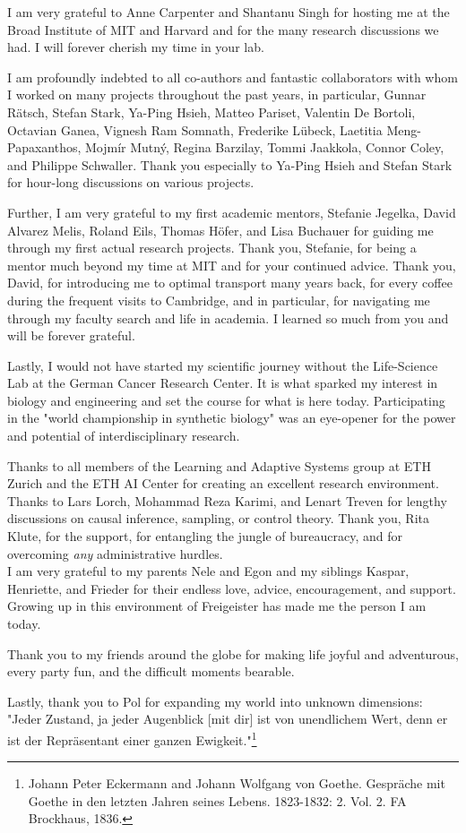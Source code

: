 I am very grateful to Anne Carpenter and Shantanu Singh for hosting me at the Broad Institute of MIT and Harvard and for the many research discussions we had. I will forever cherish my time in your lab.

I am profoundly indebted to all co-authors and fantastic collaborators with whom I worked on many projects throughout the past years, in particular, Gunnar R\"atsch, Stefan Stark, Ya-Ping Hsieh,  Matteo Pariset, Valentin De Bortoli, Octavian Ganea, Vignesh Ram Somnath, Frederike L{\"u}beck, Laetitia Meng-Papaxanthos, Mojm{\'i}r Mutn{\'y}, Regina Barzilay, Tommi Jaakkola, Connor Coley, and Philippe Schwaller. Thank you especially to Ya-Ping Hsieh and Stefan Stark for hour-long discussions on various projects. 

Further, I am very grateful to my first academic mentors, Stefanie Jegelka, David Alvarez Melis, Roland Eils, Thomas H{\"o}fer, and Lisa Buchauer for guiding me through my first actual research projects.
Thank you, Stefanie, for being a mentor much beyond my time at MIT and for your continued advice. 
Thank you, David, for introducing me to optimal transport many years back, for every coffee during the frequent visits to Cambridge, and in particular, for navigating me through my faculty search and life in academia. I learned so much from you and will be forever grateful.

Lastly, I would not have started my scientific journey without the Life-Science Lab at the German Cancer Research Center. It is what sparked my interest in biology and engineering and set the course for what is here today.
Participating in the "world championship in synthetic biology" was an eye-opener for the power and potential of interdisciplinary research.

 Thanks to all members of the Learning and Adaptive Systems group at ETH Zurich and the ETH AI Center for creating an excellent research environment. Thanks to Lars Lorch, Mohammad Reza Karimi, and Lenart Treven for lengthy discussions on causal inference, sampling, or control theory. 
Thank you, Rita Klute, for the support, for entangling the jungle of bureaucracy, and for overcoming \emph{any} administrative hurdles. \\

I am very grateful to my parents Nele and Egon and my siblings Kaspar, Henriette, and Frieder for their endless love, advice, encouragement, and support.
Growing up in this environment of Freigeister has made me the person I am today.

Thank you to my friends around the globe for making life joyful and adventurous, every party fun, and the difficult moments bearable.

Lastly, thank you to Pol for expanding my world into unknown dimensions: "Jeder Zustand, ja jeder Augenblick [mit dir] ist von unendlichem Wert, denn er ist der Repr{\"a}sentant einer ganzen Ewigkeit."\footnote{Johann Peter Eckermann and Johann Wolfgang von Goethe. Gespr{\"a}che mit Goethe in den letzten Jahren seines Lebens. 1823-1832: 2. Vol. 2. FA Brockhaus, 1836.}


\endgroup
